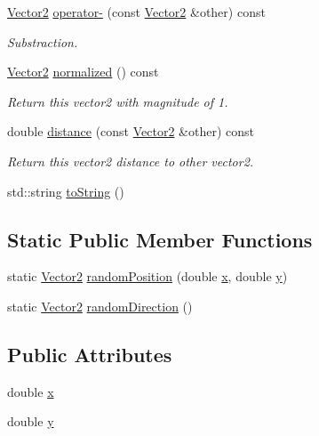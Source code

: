 \begin{DoxyCompactItemize}
\mbox{\hyperlink{struct_vector2}{Vector2}} \mbox{\hyperlink{struct_vector2_a9f6650ee1529209532c14fc0e4e97a6a}{operator-\/}} (const \mbox{\hyperlink{struct_vector2}{Vector2}} \&other) const
\begin{DoxyCompactList}\small\item\em Substraction. \end{DoxyCompactList}\item 
\mbox{\hyperlink{struct_vector2}{Vector2}} \mbox{\hyperlink{struct_vector2_a1e0be0f2d578e8b5d0b8f95a9f8b6626}{normalized}} () const
\begin{DoxyCompactList}\small\item\em Return this vector2 with magnitude of 1. \end{DoxyCompactList}\item 
double \mbox{\hyperlink{struct_vector2_a75a29091c7c6f2f38e987ed2c62283c8}{distance}} (const \mbox{\hyperlink{struct_vector2}{Vector2}} \&other) const
\begin{DoxyCompactList}\small\item\em Return this vector2 distance to other vector2. \end{DoxyCompactList}\item 
std\+::string \mbox{\hyperlink{struct_vector2_abcf7d729573613553822f965c3b9a3d2}{to\+String}} ()
\end{DoxyCompactItemize}
\subsection*{Static Public Member Functions}
\begin{DoxyCompactItemize}
\item 
static \mbox{\hyperlink{struct_vector2}{Vector2}} \mbox{\hyperlink{struct_vector2_a13b12c4d8b92bbc3de6fca42cb7a2749}{random\+Position}} (double \mbox{\hyperlink{struct_vector2_a61d73d9036ccbb3257fbe595c014a1d0}{x}}, double \mbox{\hyperlink{struct_vector2_a4df9b2a8e79e6e30a7a3b34722d8b8b8}{y}})
\item 
static \mbox{\hyperlink{struct_vector2}{Vector2}} \mbox{\hyperlink{struct_vector2_a4ae4f36c515bda9939cfe36e58b25f45}{random\+Direction}} ()
\end{DoxyCompactItemize}
\subsection*{Public Attributes}
\begin{DoxyCompactItemize}
\item 
double \mbox{\hyperlink{struct_vector2_a61d73d9036ccbb3257fbe595c014a1d0}{x}}
\item 
double \mbox{\hyperlink{struct_vector2_a4df9b2a8e79e6e30a7a3b34722d8b8b8}{y}}
\end{DoxyCompactItemize}
